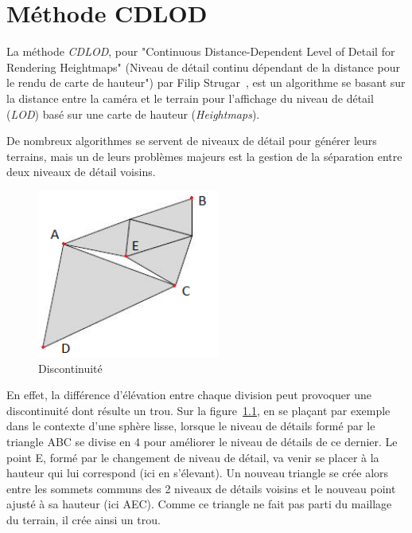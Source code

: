 \chapter{Méthode CDLOD}
  \label{chap:cdlod}

  La méthode \emph{CDLOD}, pour "Continuous Distance-Dependent Level of Detail for Rendering Heightmaps" (Niveau de détail continu dépendant de la distance pour le rendu de carte de hauteur") par Filip Strugar~\cite{CDLOD}, 
  est un algorithme se basant sur la distance entre la caméra et le terrain pour l'affichage du niveau de détail 
  (\textit{LOD}) basé sur une carte de hauteur (\emph{Heightmaps}).

  De nombreux algorithmes se servent de niveaux de détail pour générer leurs terrains, mais un de leurs problèmes majeurs est la gestion de la séparation entre deux niveaux de détail voisins.
  
 \begin{figure}
 \includegraphics[width=6cm]{img/cracks.png}
   \caption[Discontinuité]{Discontinuité\protect\footnotemark}
   \label{fig:cracks}
 \end{figure}
 
 \vspace{0.1cm}
 En effet, la différence d'élévation entre chaque division peut provoquer une discontinuité dont résulte un trou. Sur la figure~\ref{fig:cracks}, en se plaçant par exemple dans le contexte d'une sphère lisse, lorsque le niveau de détails formé par le triangle ABC se divise en 4 pour améliorer le niveau de détails de ce dernier. Le point E, formé par le changement de niveau de détail, va venir se placer à la hauteur qui lui correspond (ici en s'élevant). Un nouveau triangle se crée alors entre les sommets communs des 2 niveaux de détails voisins et le nouveau point ajusté à sa hauteur (ici AEC). Comme ce triangle ne fait pas parti du maillage du terrain, il crée ainsi un trou.\\
 \newpage{}
 
